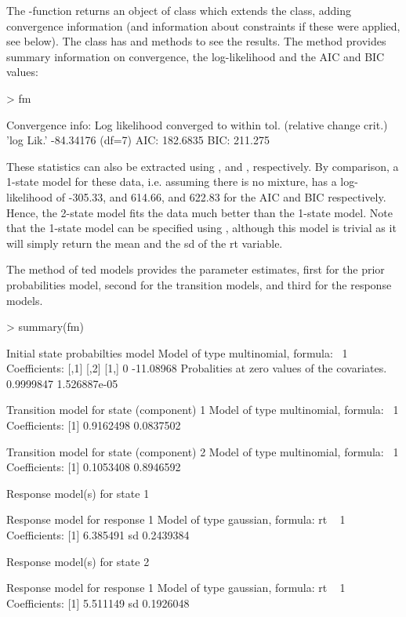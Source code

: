 \documentclass[article]{jss}
\begin{document}
The -function returns an object of class
 which extends the  class, adding
convergence information (and information about constraints if these
were applied, see below).  The class has  and
 methods to see the results.  The  method
provides summary information on convergence, the log-likelihood and
the AIC and BIC values:
\begin{Schunk}
\begin{Sinput}
> fm
\end{Sinput}
\begin{Soutput}
Convergence info: Log likelihood converged to within tol. (relative change crit.) 
'log Lik.' -84.34176 (df=7)
AIC:  182.6835 
BIC:  211.275 
\end{Soutput}
\end{Schunk}

These statistics can also be extracted using , 
and , respectively.  By comparison, a 1-state model for
these data, i.e. assuming there is no mixture, has a log-likelihood of
-305.33, and 614.66, and 622.83 for the AIC and BIC respectively.
Hence, the 2-state model fits the data much better than the 1-state
model.  Note that the 1-state model can be specified using , although this model is trivial
as it will simply return the mean and the sd of the rt variable.

The  method of ted models provides the
parameter estimates, first for the prior probabilities model, second
for the transition models, and third for the response models.
\begin{Schunk}
\begin{Sinput}
> summary(fm)
\end{Sinput}
\begin{Soutput}
Initial state probabilties model 
Model of type multinomial, formula: ~1
Coefficients: 
     [,1]      [,2]
[1,]    0 -11.08968
Probalities at zero values of the covariates.
0.9999847 1.526887e-05 

Transition model for state (component) 1 
Model of type multinomial, formula: ~1
Coefficients: 
[1] 0.9162498 0.0837502

Transition model for state (component) 2 
Model of type multinomial, formula: ~1
Coefficients: 
[1] 0.1053408 0.8946592


Response model(s) for state 1 

Response model for response 1 
Model of type gaussian, formula: rt ~ 1
Coefficients: 
[1] 6.385491
sd  0.2439384 


Response model(s) for state 2 

Response model for response 1 
Model of type gaussian, formula: rt ~ 1
Coefficients: 
[1] 5.511149
sd  0.1926048 
\end{Soutput}
\end{Schunk}
\end{document}
